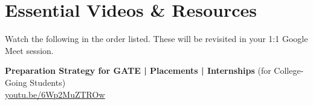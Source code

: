 \documentclass[12pt, a4paper]{article}
\newcommand{\pflink}[2]{\href{#1}{\textcolor{pfTeal}{\underline{#2}}}}
\begin{document}
\section{Essential Videos \& Resources}

Watch the following in the order listed. These will be revisited in your 1:1
Google Meet session.

\begin{alertbox}
  \small
  \textbf{Preparation Strategy for GATE | Placements | Internships}
  (for College-Going Students)\\[3pt]
  \pflink{https://youtu.be/6Wp2MuZTROw?si=_ztRWiHsB8xWkxID}%
         {youtu.be/6Wp2MuZTROw}
\end{alertbox}

\vspace{4pt}
\end{document}
